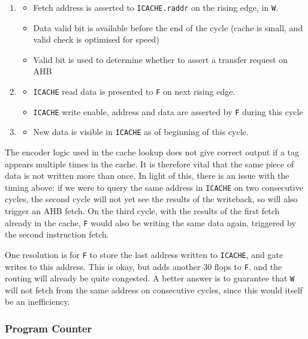 \documentclass{article}
\begin{document}
\begin{enumerate}
	\item
	\begin{itemize}
		\item Fetch address is asserted to \texttt{ICACHE.raddr} on the rising edge, in \texttt{W}.
		\item Data valid bit is available before the end of the cycle (cache is small, and valid check is optimised for speed)
		\item Valid bit is used to determine whether to assert a transfer request on AHB
	\end{itemize}
	\item
	\begin{itemize}
		\item \texttt{ICACHE} read data is presented to \texttt{F} on next rising edge.
		\item \texttt{ICACHE} write enable, address and data are asserted by \texttt{F} during this cycle
	\end{itemize}
	\item
	\begin{itemize}
		\item New data is visible in \texttt{ICACHE} as of beginning of this cycle.
	\end{itemize}
\end{enumerate}

The encoder logic used in the cache lookup does not give correct output if a tag appears multiple times in the cache. It is therefore vital that the same piece of data is not written more than once. In light of this, there is an issue with the timing above: if we were to query the same address in \texttt{ICACHE} on two consecutive cycles, the second cycle will not yet see the results of the writeback, so will also trigger an AHB fetch. On the third cycle, with the results of the first fetch already in the cache, \texttt{F} would also be writing the same data again, triggered by the second instruction fetch.

One resolution is for \texttt{F} to store the last address written to \texttt{ICACHE}, and gate writes to this address. This is okay, but adds another 30 flops to \texttt{F}, and the routing will already be quite congested. A better answer is to guarantee that \texttt{W} will not fetch from the same address on consecutive cycles, since this would itself be an inefficiency.


\subsubsection{Program Counter}
\end{document}
